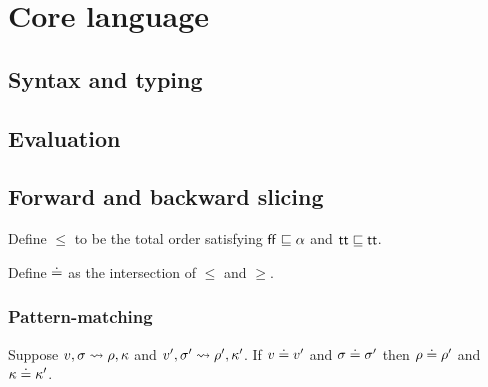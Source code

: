 \section{Core language}

\subsection{Syntax and typing}







\subsection{Evaluation}



\subsection{Forward and backward slicing}



\begin{definition}
   Define $\leq$ to be the total order satisfying $\mathsf{ff} \sqsubseteq \alpha$ and $\mathsf{tt} \sqsubseteq \mathsf{tt}$.
\end{definition}

\begin{definition}
   Define $\doteq$ as the intersection of $\leq$ and $\geq$.
\end{definition}




\subsubsection{Pattern-matching}




\begin{lemma}
   Suppose $v, \sigma \rightsquigarrow \rho, \kappa$ and $v', \sigma' \rightsquigarrow \rho', \kappa'$. If $v \doteq v'$ and $\sigma \doteq \sigma'$ then $\rho \doteq \rho'$ and $\kappa \doteq \kappa'$.
\end{lemma}

